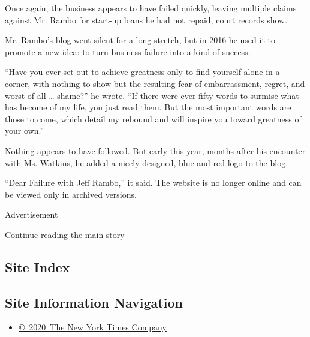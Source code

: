 Once again, the business appears to have failed quickly, leaving
multiple claims against Mr. Rambo for start-up loans he had not repaid,
court records show.

Mr. Rambo's blog went silent for a long stretch, but in 2016 he used it
to promote a new idea: to turn business failure into a kind of success.

``Have you ever set out to achieve greatness only to find yourself alone
in a corner, with nothing to show but the resulting fear of
embarrassment, regret, and worst of all \ldots{} shame?'' he wrote. ``If
there were ever fifty words to surmise what has become of my life, you
just read them. But the most important words are those to come, which
detail my rebound and will inspire you toward greatness of your own.''

Nothing appears to have followed. But early this year, months after his
encounter with Ms. Watkins, he added
\href{https://web.archive.org/web/20170912110924/http://jefframbo.com/}{a
nicely designed, blue-and-red logo} to the blog.

``Dear Failure with Jeff Rambo,'' it said. The website is no longer
online and can be viewed only in archived versions.

Advertisement

\protect\hyperlink{after-bottom}{Continue reading the main story}

\hypertarget{site-index}{%
\subsection{Site Index}\label{site-index}}

\hypertarget{site-information-navigation}{%
\subsection{Site Information
Navigation}\label{site-information-navigation}}

\begin{itemize}
\tightlist
\item
  \href{https://help.nytimes3xbfgragh.onion/hc/en-us/articles/115014792127-Copyright-notice}{©~2020~The
  New York Times Company}
\end{itemize}

